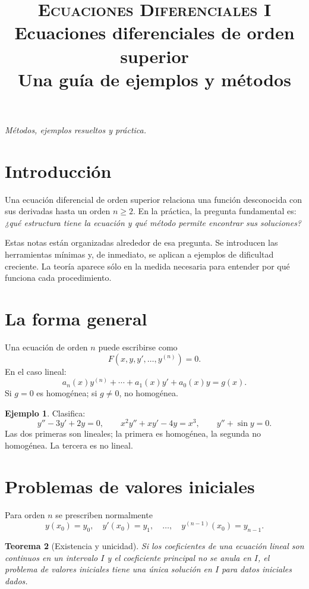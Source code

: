 \documentclass[11pt]{article}
\title{\textsc{Ecuaciones Diferenciales I}\\[4pt]\Large Ecuaciones diferenciales de orden superior\\[5pt]\large Una guía de ejemplos y métodos}
\author{}\date{}
\newtheorem{teorema}{Teorema}[section]
\theoremstyle{definition}
\newtheorem{ejemplo}[teorema]{Ejemplo}
\begin{document}
\maketitle
\begin{center}\emph{Métodos, ejemplos resueltos y práctica.}\end{center}

\section*{Introducción}
Una ecuación diferencial de orden superior relaciona una función desconocida con sus
derivadas hasta un orden $n\geq2$. En la práctica, la pregunta fundamental es:
\emph{¿qué estructura tiene la ecuación y qué método permite encontrar sus soluciones?}

Estas notas están organizadas alrededor de esa pregunta. Se introducen las herramientas
mínimas y, de inmediato, se aplican a ejemplos de dificultad creciente. La teoría aparece
sólo en la medida necesaria para entender por qué funciona cada procedimiento.

\tableofcontents

\section{La forma general}
Una ecuación de orden $n$ puede escribirse como
\[
F(x,y,y',\ldots,y^{(n)})=0.
\]
En el caso lineal:
\[
a_n(x)y^{(n)}+\cdots+a_1(x)y'+a_0(x)y=g(x).
\]
Si $g=0$ es homogénea; si $g\ne0$, no homogénea.

\begin{ejemplo}
Clasifica:
\[
y''-3y'+2y=0,\qquad x^2y''+xy'-4y=x^3,\qquad y''+\sin y=0.
\]
Las dos primeras son lineales; la primera es homogénea, la segunda no homogénea.
La tercera es no lineal.
\end{ejemplo}

\section{Problemas de valores iniciales}
Para orden $n$ se prescriben normalmente
\[
y(x_0)=y_0,\quad y'(x_0)=y_1,\quad\ldots,\quad y^{(n-1)}(x_0)=y_{n-1}.
\]

\begin{teorema}[Existencia y unicidad]
Si los coeficientes de una ecuación lineal son continuos en un intervalo $I$ y el coeficiente principal no se anula en $I$, el problema de valores iniciales tiene una única solución en $I$ para datos iniciales dados.
\end{teorema}
\end{document}
